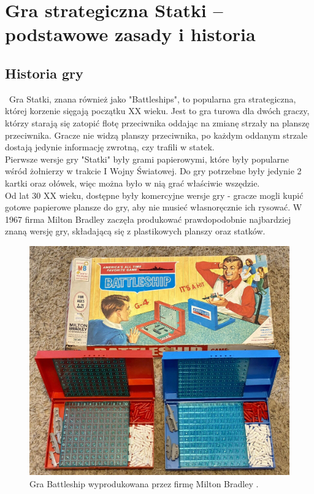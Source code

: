 \newpage %
\section{Gra strategiczna Statki – podstawowe zasady i historia}

\subsection{Historia gry}
\indent\ Gra Statki, znana również jako "Battleships", to popularna gra strategiczna, której korzenie sięgają początku XX wieku. Jest to gra turowa dla dwóch graczy, którzy starają się zatopić flotę przeciwnika oddając na zmianę strzały na planszę przeciwnika. Gracze nie widzą planszy przeciwnika, po każdym oddanym strzale dostają jedynie informację zwrotną, czy trafili w statek.
\\ \indent Pierwsze wersje gry "Statki" były grami papierowymi, które były popularne wśród żołnierzy w trakcie I Wojny Światowej. Do gry potrzebne były jedynie 2 kartki oraz ołówek, więc można było w nią grać właściwie wszędzie. \cite{historyWiki}
\\ \indent Od lat 30 XX wieku, dostępne były komercyjne wersje gry - gracze mogli kupić gotowe papierowe plansze do gry, aby nie musieć własnoręcznie ich rysować. W 1967 firma Milton Bradley zaczęła produkować prawdopodobnie najbardziej znaną wersję gry, składającą się z plastikowych planszy oraz statków. \cite{historyWiki} \cite{museumOfGames}

\begin{figure}[!h]
    \label{fig:milton-bradley-game}
    \centering \includegraphics[width=0.8\linewidth]{img/milton_bradley_game.jpg}
    \caption{Gra Battleship wyprodukowana przez firmę Milton Bradley \cite{eBay}.}
\end{figure}

